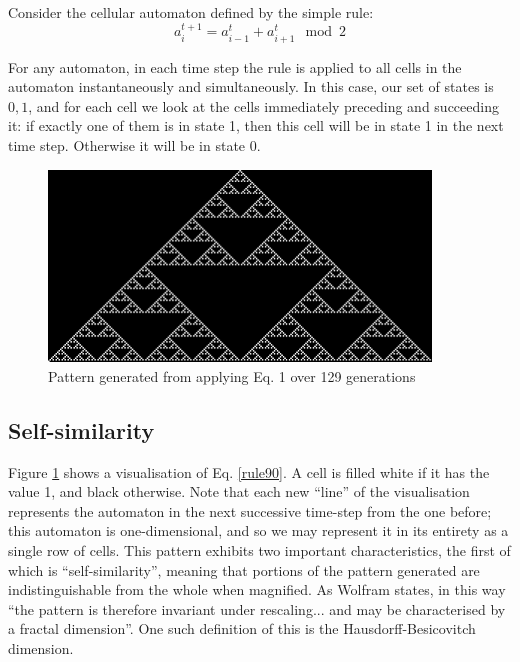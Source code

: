 \documentclass[11pt,a4paper]{article}
\begin{document}
    Consider the cellular automaton defined by the simple rule:
    \begin{equation}
        \label{rule90}
        a_{i}^{t+1} = a_{i-1}^{t} + a_{i+1}^{t} \mod{2}
    \end{equation}

    For any automaton, in each time step the rule is applied to all cells in the
    automaton instantaneously and simultaneously. In this case, our set of
    states is ${0,1}$, and for each cell we look at the cells immediately
    preceding and succeeding it: if exactly one of them is in state 1, then this
    cell will be in state 1 in the next time step. Otherwise it will be in state
    0.

    \begin{figure}[h]
        \begin{center}
            \includegraphics[width=4in]{rule1.png}
            \caption{Pattern generated from applying Eq. 1 over 129 generations}
            \label{fig:rule90}
        \end{center}
    \end{figure}

    \subsection{Self-similarity}
    Figure \ref{fig:rule90} shows a visualisation of Eq. \ref{rule90}. A cell is
    filled white if it has the value 1, and black otherwise. Note that each new
    ``line'' of the visualisation represents the automaton in the next
    successive time-step from the one before; this automaton is one-dimensional,
    and so we may represent it in its entirety as a single row of cells. This
    pattern exhibits two important characteristics, the first of which is
    ``self-similarity'', meaning that portions of the pattern generated are
    indistinguishable from the whole when magnified. As Wolfram states, in this
    way ``the pattern is therefore invariant under rescaling... and may be
    characterised by a fractal dimension''\cite{WolframFractal}. One such
    definition of this is the Hausdorff-Besicovitch dimension\cite{Hausdorff}.
\end{document}
